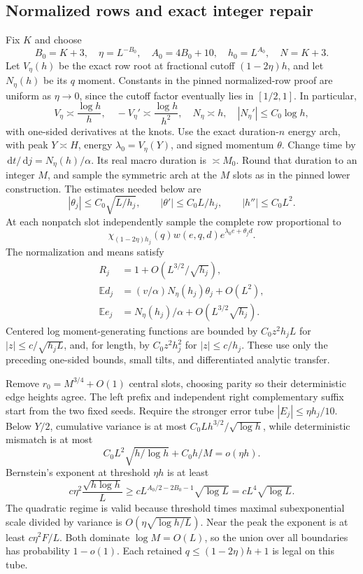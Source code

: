 \documentclass[11pt,letterpaper]{article}
\numberwithin{equation}{section}
\theoremstyle{remark}\newtheorem{remark}[theorem]{Remark}
\newcommand{\dd}{\,\mathrm d}
\begin{document}
\subsection{Normalized rows and exact integer repair}
Fix $K$ and choose
\begin{equation}\label{a61:ao:eq:cutoffs}
 B_0=K+3,\quad\eta=L^{-B_0},\quad A_0=4B_0+10,
 \quad h_0=L^{A_0},\quad N=K+3.
\end{equation}
Let $V_\eta(h)$ be the exact row root at fractional cutoff
$(1-2\eta)h$, and let $N_\eta(h)$ be its $q$ moment. Constants in the
pinned normalized-row proof are uniform as $\eta\to0$, since the
cutoff factor eventually lies in $[1/2,1]$. In particular,
\[
 V_\eta\asymp\frac{\log h}h,\quad
 -V_\eta'\asymp\frac{\log h}{h^2},\quad
 N_\eta\asymp h,\quad |N_\eta'|\le C_0\log h,
\]
with one-sided derivatives at the knots. Use the exact duration-$n$
energy arch, with peak $Y\asymp H$, energy
$\lambda_0=V_\eta(Y)$, and signed momentum $\theta$. Change time by
$\dd t/\dd j=N_\eta(h)/\alpha$. Its real macro duration is
$\asymp M_0$. Round that duration to an integer $M$, and sample the
symmetric arch at the $M$ slots as in the pinned lower construction.
The estimates needed below are
\[
 |\theta_j|\le C_0\sqrt{L/h_j},\qquad
 |\theta'|\le C_0L/h_j,\qquad |h''|\le C_0L^2.
\]
At each nonpatch slot independently sample the complete row
proportional to
\[
 \chi_{(1-2\eta)h_j}(q)w(e,q,d)e^{\lambda_0e+\theta_jd}.
\]
The normalization and means satisfy
\begin{align*}
 R_j&=1+O(L^{3/2}/\sqrt{h_j}),\\
 \mathbb E d_j&=(v/\alpha)N_\eta(h_j)\theta_j+O(L^2),\\
 \mathbb E e_j&=N_\eta(h_j)/\alpha+O(L^{3/2}\sqrt{h_j}).
\end{align*}
Centered log moment-generating functions are bounded by $C_0z^2h_jL$
for $|z|\le c/\sqrt{h_jL}$, and, for length, by $C_0z^2h_j^2$ for
$|z|\le c/h_j$. These use only the preceding one-sided bounds, small
tilts, and differentiated analytic transfer.

Remove $r_0=M^{3/4}+O(1)$ central slots, choosing parity so their
deterministic edge heights agree. The left prefix and independent
right complementary suffix start from the two fixed seeds. Require
the stronger error tube $|E_j|\le\eta h_j/10$. Below $Y/2$, cumulative
variance is at most $C_0Lh^{3/2}/\sqrt{\log h}$, while deterministic
mismatch is at most
\[
 C_0L^2\sqrt{h/\log h}+C_0h/M=o(\eta h).
\]
Bernstein's exponent at threshold $\eta h$ is at least
\[
 c\eta^2\frac{\sqrt{h\log h}}L
 \ge cL^{A_0/2-2B_0-1}\sqrt{\log L}
 =cL^4\sqrt{\log L}.
\]
The quadratic regime is valid because threshold times maximal
subexponential scale divided by variance is
$O(\eta\sqrt{\log h/L})$. Near the peak the exponent is at least
$c\eta^2F/L$. Both dominate $\log M=O(L)$, so the union over all
boundaries has probability $1-o(1)$. Each retained
$q\le(1-2\eta)h+1$ is legal on this tube.
\end{document}
